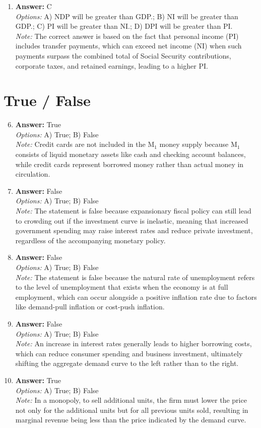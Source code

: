 \documentclass[12pt]{article}
\begin{document}
\begin{enumerate}[label=\arabic*.]
\item \textbf{Answer:} C
\\ \textit{Options:} A) NDP will be greater than GDP.; B) NI will be greater than GDP.; C) PI will be greater than NI.; D) DPI will be greater than PI.
\\ \textit{Note:} The correct answer is based on the fact that personal income (PI) includes transfer payments, which can exceed net income (NI) when such payments surpass the combined total of Social Security contributions, corporate taxes, and retained earnings, leading to a higher PI.
\end{enumerate}

\section*{True / False}
\begin{enumerate}[label=\arabic*.]
\setcounter{enumi}{5}
\item \textbf{Answer:} True
\\ \textit{Options:} A) True; B) False
\\ \textit{Note:} Credit cards are not included in the M$_{1}$ money supply because M$_{1}$ consists of liquid monetary assets like cash and checking account balances, while credit cards represent borrowed money rather than actual money in circulation.
\item \textbf{Answer:} False
\\ \textit{Options:} A) True; B) False
\\ \textit{Note:} The statement is false because expansionary fiscal policy can still lead to crowding out if the investment curve is inelastic, meaning that increased government spending may raise interest rates and reduce private investment, regardless of the accompanying monetary policy.
\item \textbf{Answer:} False
\\ \textit{Options:} A) True; B) False
\\ \textit{Note:} The statement is false because the natural rate of unemployment refers to the level of unemployment that exists when the economy is at full employment, which can occur alongside a positive inflation rate due to factors like demand-pull inflation or cost-push inflation.
\item \textbf{Answer:} False
\\ \textit{Options:} A) True; B) False
\\ \textit{Note:} An increase in interest rates generally leads to higher borrowing costs, which can reduce consumer spending and business investment, ultimately shifting the aggregate demand curve to the left rather than to the right.
\item \textbf{Answer:} True
\\ \textit{Options:} A) True; B) False
\\ \textit{Note:} In a monopoly, to sell additional units, the firm must lower the price not only for the additional units but for all previous units sold, resulting in marginal revenue being less than the price indicated by the demand curve.
\end{enumerate}
\end{document}
